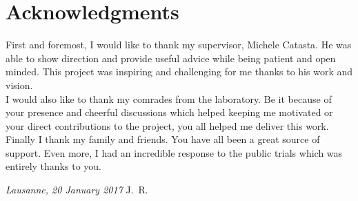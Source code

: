\chapter*{Acknowledgments}
First and foremost, I would like to thank my supervisor, Michele Catasta. He was able to show direction and provide useful advice while being patient and open minded. This project was inspiring and challenging for me thanks to his work and vision.\\
I would also like to thank my comrades from the laboratory. Be it because of your presence and cheerful discussions which helped keeping me motivated or your direct contributions to the project, you all helped me deliver this work.\\
Finally I thank my family and friends. You have all been a great source of support. Even more, I had an incredible response to the public trials which was entirely thanks to you.

\bigskip
 
\noindent\textit{Lausanne, 20 January 2017}
\hfill J.~R.